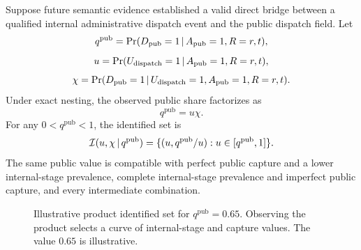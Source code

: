 \documentclass[11pt]{article}
\begin{document}
Suppose future semantic evidence established a valid direct bridge between a qualified internal administrative dispatch event and the public dispatch field. Let
\begin{equation}
q^{\mathrm{pub}}=\Pr(D_{\mathrm{pub}}=1\,|\, A_{\mathrm{pub}}=1,R=r,t),
\end{equation}
\begin{equation}
u=\Pr(U_{\mathrm{dispatch}}=1\,|\, A_{\mathrm{pub}}=1,R=r,t),
\end{equation}
\begin{equation}
\chi=\Pr(D_{\mathrm{pub}}=1\,|\, U_{\mathrm{dispatch}}=1,A_{\mathrm{pub}}=1,R=r,t).
\end{equation}
Under exact nesting, the observed public share factorizes as
\begin{equation}
q^{\mathrm{pub}}=u\chi.
\label{eq:product}
\end{equation}
For any $0<q^{\mathrm{pub}}<1$, the identified set is
\begin{equation}
\mathcal{I}(u,\chi\,|\, q^{\mathrm{pub}})
=\{(u,q^{\mathrm{pub}}/u):u\in[q^{\mathrm{pub}},1]\}.
\label{eq:hyperbola}
\end{equation}
The same public value is compatible with perfect public capture and a lower internal-stage prevalence, complete internal-stage prevalence and imperfect public capture, and every intermediate combination.

\begin{figure}[t]
\centering
{}
\caption{Illustrative product identified set for $q^{\mathrm{pub}}=0.65$. Observing the product selects a curve of internal-stage and capture values. The value $0.65$ is illustrative.}
\label{fig:hyperbola}
\end{figure}
\end{document}

